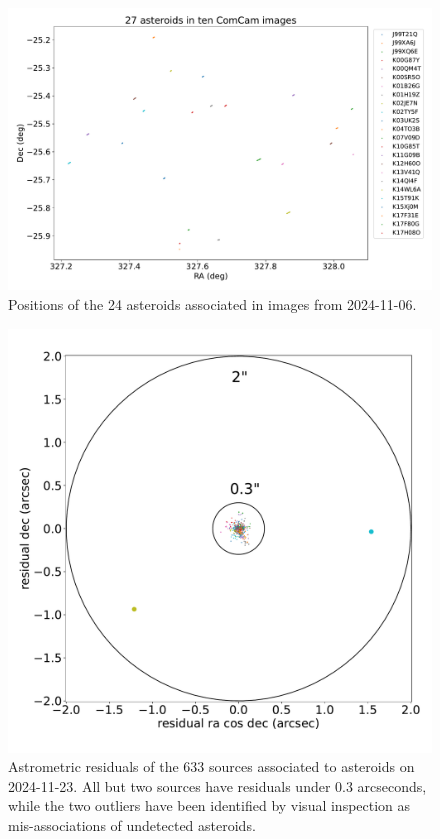 \begin{figure}
  \label{fig:solar_system_positions}
  \includegraphics[width=\textwidth]{sso_figures/24_asteroids.pdf}
  \caption{Positions of the 24 asteroids associated in images from 2024-11-06.}
\end{figure}

\begin{figure}
  \label{fig:solar_system_residuals}
  \includegraphics[width=\textwidth]{sso_figures/sso_residuals.pdf}
  \caption{Astrometric residuals of the 633 sources associated to asteroids on 2024-11-23. All but two sources have residuals under 0.3 arcseconds, while the two outliers have been identified by visual inspection as mis-associations of undetected asteroids.}
\end{figure}

